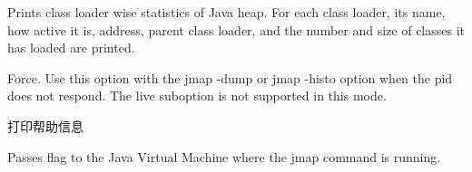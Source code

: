 Prints class loader wise statistics of Java heap. For each class loader, its name, how active it is, address, parent class loader, and the number and size of classes it has loaded are printed.

Force. Use this option with the jmap -dump or jmap -histo option when the pid does not respond. The live suboption is not supported in this mode.

打印帮助信息

Passes flag to the Java Virtual Machine where the jmap command is running.